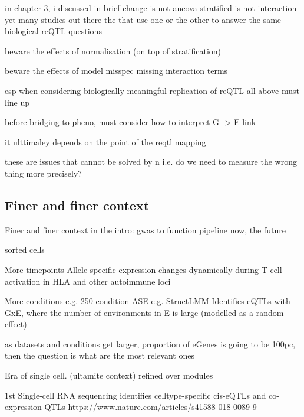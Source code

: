 \begin{outline}
            in chapter 3, i discussed in brief
                change is not ancova
                stratified is not interaction
                yet many studies out there the that use one or the other to answer the same biological reQTL questions

        beware the effects of normalisation (on top of stratification)

        beware the effects of model misspec
            missing interaction terms

        esp when considering biologically meaningful replication of reQTL
            all above must line up

    before bridging to pheno, must consider how to interpret G -> E link
    
    it ulttimaley depends on the point of the reqtl mapping

    these are issues that cannot be solved by n
        i.e. do we need to measure the wrong thing more precisely?

\subsection{Finer and finer context}

Finer and finer context
    in the intro: gwas to function pipeline
    now, the future

    sorted cells

    More timepoints
    Allele-specific expression changes dynamically during T cell activation in HLA and other autoimmune loci

    More conditions
    e.g. 250 condition ASE %
    e.g. StructLMM 
        Identifies eQTLs with GxE, where the number of environments in E is large (modelled as a random effect)

    as datasets and conditions get larger, proportion of eGenes is going to be 100pc, then the question is what are the most relevant ones

    Era of single cell. (ultamite context)
        refined over modules
        
        1st
        Single-cell RNA sequencing identifies celltype-specific cis-eQTLs and co-expression QTLs
        https://www.nature.com/articles/s41588-018-0089-9


\end{outline}

